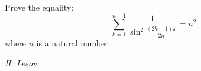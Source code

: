 Prove the equality:
$$\sum_{k=1}^{n-1}\frac1{\sin^2\frac{(2k+1)\pi}{2n}}=n^2$$where $n$ is a natural number.

\textit{H. Lesov}